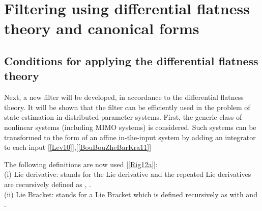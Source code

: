 \documentclass[journal]{IEEEtran}
\begin{document}
\section{Filtering using differential flatness theory and canonical forms} \label{section 2: Filtering_using_differential_flatness_theory_and_canonical_forms}





\subsection{Conditions for applying the differential flatness theory} \label{subsection 3.3: diffeomorphism_canonical_form}

\noindent Next, a new filter will be developed, in accordance to the differential flatness theory. It will be shown that the filter can be efficiently used in the problem of state estimation in distributed parameter systems. First, the  generic class of nonlinear systems  (including MIMO systems) is considered. Such systems can be transformed to the form of an affine in-the-input system by adding an integrator to each input [\ref{Lev10}],[\ref{BouBouZheBarKra11}]



\noindent The following definitions are now used [\ref{Rig12a}]:\\

\noindent (i) Lie derivative:   stands for the Lie derivative  and the repeated Lie derivatives are recursively defined as , . \\

\noindent (ii) Lie Bracket:  stands for a Lie Bracket which is defined recursively as  with  and .  \\
\end{document}
